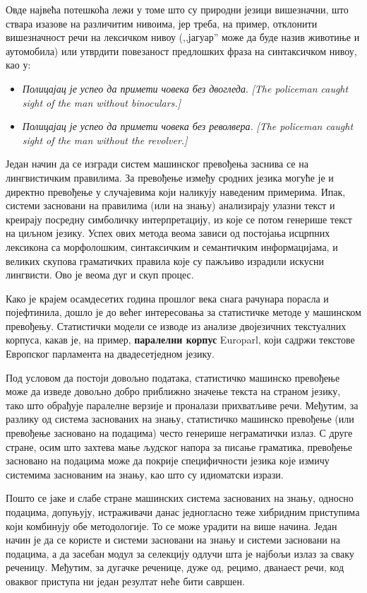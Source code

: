 \begin{multicols}{2}
Овде највећа потешкоћа лежи у томе што су природни језици вишезначни, што ствара изазове на различитим нивоима, јер треба, на пример, отклонити вишезначност речи на лексичком нивоу (,,јагуар'' може да буде назив животиње и аутомобила) или утврдити повезаност предлошких фраза на синтаксичком нивоу, као у:

\begin{itemize} 
\item \textit{Полицајац је успео да примети човека без двогледа}. \textit{[The policeman caught sight of the man without binoculars.]}
\item \textit{Полицајац је успео да примети човека без револвера.} \textit{[The policeman caught sight of  the man without the revolver.]}
\end{itemize}
Један начин да се изгради систем машинског превођења заснива се на лингвистичким правилима. За превођење између сродних језика могуће је и директно превођење у случајевима који наликују наведеним примерима. Ипак, системи засновани на правилима (или на знању) анализирају улазни текст и креирају посредну симболичку интерпретацију, из које се потом генерише текст на циљном језику. Успех ових метода веома зависи од постојања исцрпних лексикона са морфолошким, синтаксичким и семантичким информацијама, и великих скупова граматичких правила које су пажљиво израдили искусни лингвисти. Ово је веома дуг и скуп процес.

Како је крајем осамдесетих година прошлог века снага рачунара порасла и појефтинила, дошло је до већег интересовања за статистичке методе у машинском превођењу. Статистички модели се изводе из анализе двојезичних текстуалних корпуса, какав је, на пример, \textbf{паралелни корпус} Europarl, који садржи текстове Европског парламента на двадесетједном језику. 

Под условом да постоји довољно података, статистичко машинско превођење може да изведе довољно добро приближно значење текста на страном језику, тако што обрађује паралелне верзије и проналази прихватљиве речи. Међутим, за разлику од система заснованих на знању, статистичко машинско превођење (или превођење засновано на подацима) често генерише неграматички излаз. С друге стране, осим што захтева мање људског напора за писање граматика, превођење засновано на подацима  може да покрије специфичности језика које измичу системима заснованим на знању, као што су идиоматски изрази.  

Пошто се јаке и слабе стране машинских система заснованих на знању, односно подацима, допуњују, истраживачи данас једногласно теже хибридним приступима који комбинују обе методологије. То се може урадити на више начина. Један начин је да се користе и системи засновани на знању и системи засновани на подацима, а да засебан модул за селекцију одлучи шта је најбољи излаз за сваку реченицу. Међутим, за дугачке реченице, дуже од, рецимо, дванаест речи, код оваквог приступа ни један резултат неће бити савршен. 


\end{multicols}
